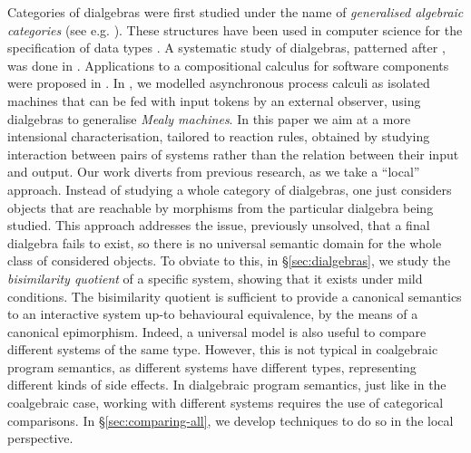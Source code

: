 \documentclass[orivec]{llncs}
\begin{document}
Categories of dialgebras were first studied under the name of \emph{generalised algebraic categories} (see e.g. \cite{TG69,Ada76}). These structures have been used in computer science for the specification of data types \cite{Hag87,PZ01}. A systematic study of dialgebras, patterned after \cite{Rut00}, was done in \cite{Vou10}. Applications to a compositional calculus for software components were proposed in \cite{CiE11}.  In \cite{Cia11}, we modelled asynchronous process calculi as isolated machines that can be fed with input tokens by an external observer, using dialgebras to generalise \emph{Mealy machines}. In this paper we aim at a more intensional characterisation, tailored to reaction rules, obtained by studying interaction between pairs of systems rather than the relation between their input and output. Our work diverts from previous research, as we take a ``local'' approach. Instead of studying a whole category of dialgebras, 
one just considers objects that are reachable by morphisms from the particular dialgebra being studied.
This approach addresses the issue, previously unsolved, that a final dialgebra fails to exist, so there is no universal semantic domain for the whole class of considered objects. To obviate to this, in \S \ref{sec:dialgebras}, we study the \emph{bisimilarity quotient} of a specific system, showing that it exists under mild conditions. The bisimilarity quotient is sufficient to provide a canonical semantics to an interactive system up-to behavioural equivalence, by the means of a canonical epimorphism. Indeed, a universal model is also useful to compare different systems of the same type. However, this is not typical in coalgebraic program semantics, as different systems have different types, representing different kinds of side effects. In dialgebraic program semantics, just like in the coalgebraic case, working with different systems requires the use of categorical comparisons. In \S \ref{sec:comparing-all}, we develop techniques to do so in the local perspective.
\end{document}
